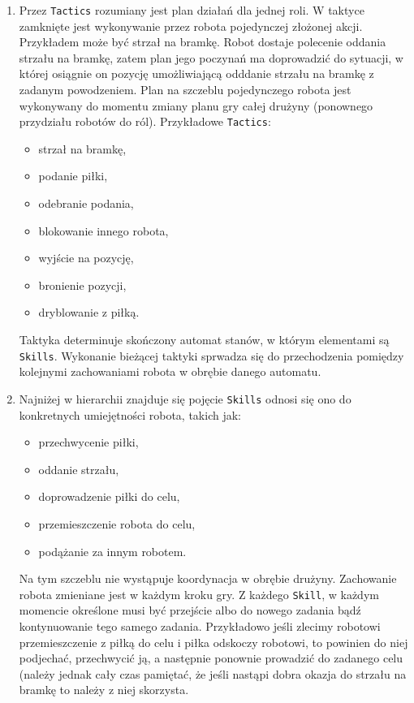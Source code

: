 \begin{enumerate}
  \item Przez \texttt{Tactics} rozumiany jest plan działań dla jednej roli. W taktyce zamknięte jest wykonywanie przez robota pojedynczej złożonej akcji.
  Przykładem może być strzał na bramkę. Robot dostaje polecenie oddania strzału na bramkę, zatem plan jego poczynań ma doprowadzić
 do sytuacji, w której osiągnie on pozycję umożliwiającą odddanie strzału na bramkę z zadanym powodzeniem.
 Plan na szczeblu pojedynczego robota jest wykonywany do momentu zmiany planu gry całej drużyny (ponownego przydziału robotów do ról).
 Przykładowe \texttt{Tactics}:
 \begin{itemize}
  \item strzał na bramkę,
  \item podanie piłki,
  \item odebranie podania,
  \item blokowanie innego robota,
  \item wyjście na pozycję,
  \item bronienie pozycji,
  \item dryblowanie z piłką.
 \end{itemize}
  Taktyka determinuje skończony automat stanów, w którym elementami są \texttt{Skills}. Wykonanie bieżącej taktyki sprwadza się do przechodzenia pomiędzy kolejnymi zachowaniami robota w obrębie
  danego automatu.
  \item Najniżej w hierarchii znajduje się pojęcie \texttt{Skills} odnosi się ono do konkretnych umiejętności robota, takich jak:
    \begin{itemize}
    \item przechwycenie piłki,
    \item oddanie strzału,
    \item doprowadzenie piłki do celu,
    \item przemieszczenie robota do celu,
    \item podążanie za innym robotem.
    \end{itemize}
  Na tym szczeblu nie wystąpuje koordynacja w obrębie drużyny. Zachowanie robota zmieniane jest w każdym kroku gry. Z każdego \texttt{Skill}, w każdym momencie określone musi być przejście
  albo do nowego zadania bądź kontynuowanie tego samego zadania. Przykładowo jeśli zlecimy robotowi przemieszczenie z piłką do celu i piłka 
  odskoczy robotowi, to powinien do niej podjechać, przechwycić ją, a następnie ponownie prowadzić do zadanego celu (należy jednak cały czas pamiętać, że jeśli nastąpi dobra okazja do strzału
na bramkę to należy z niej skorzysta.
\end{enumerate}

